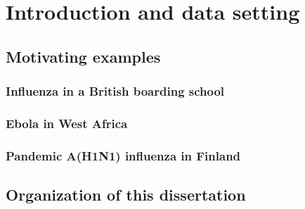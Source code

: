 \chapter{Introduction and data setting}
\label{chap:introduction}

\section{Motivating examples}
\label{sec:motivatingexamples}

\subsection{Influenza in a British boarding school}
\label{subsec:bbs_motivation}

\subsection{Ebola in West Africa}
\label{subsec:ebola_motivation}

\subsection{Pandemic A(H1N1) influenza in Finland}
\label{subsec:flu_motivation}

\section{Organization of this dissertation}
\label{sec:organization}